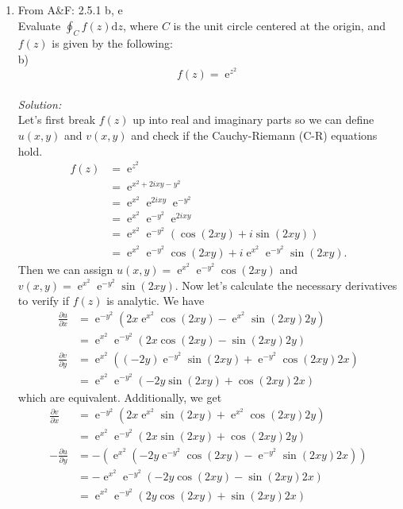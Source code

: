 \documentclass[10pt]{amsart}
\newcommand{\D}{\mathrm{d}}
\DeclareMathOperator{\E}{e}
\theoremstyle{nonumberplain}
\begin{document}
\begin{enumerate}[label={\bf {\arabic*}:}]
\item From A\&F: 2.5.1 b, e \\
Evaluate $\oint_C f(z)\D z$, where $C$ is the unit circle centered at the origin, and $f(z)$ is given by the following: \\
b) $$f(z) = \E^{z^2}$$ \\
\textit{Solution:} \\
Let's first break $f(z)$ up into real and imaginary parts so we can define $u(x, y)$ and $v(x, y)$ and check if the Cauchy-Riemann (C-R) equations hold.
\begin{align*}
f(z) &= \E^{z^2} \\
	&= \E^{ x^2 + 2ixy - y^2} \\
	&= \E^{x^2}\E^{2ixy}\E^{- y^2} \\
	&= \E^{x^2}\E^{- y^2}\E^{2ixy} \\
	&= \E^{x^2}\E^{- y^2}\left( \cos (2xy) + i \sin (2xy)\right) \\
	&= \E^{x^2}\E^{- y^2}\cos (2xy) + i \E^{x^2}\E^{- y^2}\sin (2xy).
\end{align*}
Then we can assign $u(x, y) = \E^{x^2}\E^{- y^2}\cos (2xy)$ and $v(x, y) = \E^{x^2}\E^{- y^2}\sin (2xy)$.
Now let's calculate the necessary derivatives to verify if $f(z)$ is analytic.
We have
\begin{align*}
\frac {\partial u}{\partial x} &= \E^{-y^2}\left( 2x\E^{x^2}\cos (2xy) - \E^{x^2} \sin (2xy)2y\right) \\
	&= \E^{x^2}\E^{-y^2}\left( 2x\cos (2xy) - \sin (2xy)2y\right) \\
\frac {\partial v}{\partial y} &= \E^{x^2}\left( (-2y)\E^{-y^2}\sin(2xy) + \E^{-y^2}\cos (2xy)2x\right) \\
	&= \E^{x^2}\E^{-y^2}\left( -2y\sin(2xy) + \cos (2xy)2x\right)
\end{align*}
which are equivalent.
Additionally, we get
\begin{align*}
\frac {\partial v}{\partial x} &= \E^{- y^2} \left( 2x\E^{x^2}\sin (2xy) + \E^{x^2}\cos (2xy)2y \right) \\
	&= \E^{x^2}\E^{- y^2} \left( 2x\sin (2xy) + \cos (2xy)2y \right) \\
- \frac {\partial u}{\partial y} &= -\left( \E^{x^2} \left( -2y\E^{- y^2}\cos (2xy) - \E^{- y^2}\sin (2xy)2x \right) \right) \\
	&= - \E^{x^2} \E^{- y^2} \left( -2y\cos (2xy) - \sin (2xy)2x \right) \\
	&= \E^{x^2} \E^{-y^2} \left(2y\cos (2xy) + \sin (2xy)2x \right)
\end{align*}

\end{enumerate}
\end{document}
